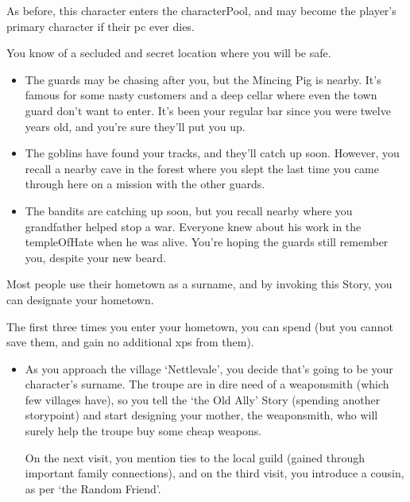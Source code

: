\begin{multicols}{2}
As before, this character enters the \gls{characterPool}, and may become the player's primary character if their \gls{pc} ever dies.

You know of a secluded and secret location where you will be safe.

\begin{itemize}
  \item
  The guards may be chasing after you, but the Mincing Pig is nearby.  It's famous for some nasty customers and a deep cellar where even the town guard don't want to enter.
  It's been your regular bar since you were twelve years old, and you're sure they'll put you up.
  \item
  The goblins have found your tracks, and they'll catch up soon.
  However, you recall a nearby cave in the forest where you slept the last time you came through here on a mission with the other guards.
  \item
  The bandits are catching up soon, but you recall  nearby where you grandfather helped stop a war.
  Everyone knew about his work in the \gls{templeOfHate} when he was alive.
  You're hoping the guards still remember you, despite your new beard.
\end{itemize}

Most people use their hometown as a surname, and by invoking this Story, you can designate your hometown.

The first three times you enter your hometown, you can spend  (but you cannot save them, and gain no additional \glspl{xp} from them).

\begin{itemize}
  \item
  As you approach the \gls{village} `Nettlevale', you decide that's going to be your character's surname.
  The troupe are in dire need of a weaponsmith (which few \glspl{village} have), so you tell the `the Old Ally' Story (spending another \gls{storypoint}) and start designing your mother, the weaponsmith, who will surely help the troupe buy some cheap weapons.

  On the next visit, you mention ties to the local guild (gained through important family connections), and on the third visit, you introduce a cousin, as per `the Random Friend'.
\end{itemize}

\end{multicols}
